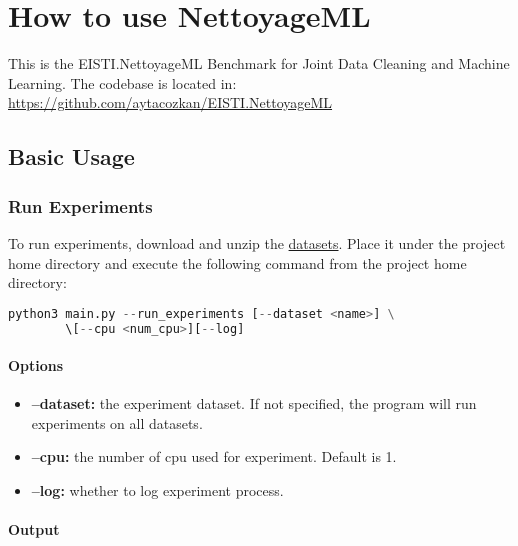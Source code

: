 \chapter{How to use NettoyageML} 

\begin{flushleft}
	This is the EISTI.NettoyageML Benchmark for Joint Data Cleaning and Machine Learning. 
	The codebase is located in: \url{https://github.com/aytacozkan/EISTI.NettoyageML}
\end{flushleft}

\section{Basic Usage}

\subsection*{Run Experiments}

\begin{flushleft}
	To run experiments, download and unzip the 
	\href{https://drive.google.com/file/d/1BdLZAyp5KSvj8AdL2by9bNkRxX8po1FL/view?usp=sharing}{datasets}. 
	Place it under the project home directory and execute the following command from the project home directory:
\end{flushleft}


\begin{lstlisting}[language=python]
		python3 main.py --run_experiments [--dataset <name>] \
		\[--cpu <num_cpu>][--log]
\end{lstlisting}

\subsubsection*{Options}

\begin{itemize}
	\item {
		\textbf{--dataset:} the experiment dataset. If not specified, the program will run experiments on all datasets.
	}
	\item {
		\textbf{--cpu:} the number of cpu used for experiment. Default is 1.
	}
	\item {
	\textbf{--log:} whether to log experiment process.
	}
\end{itemize}


\subsubsection*{Output}

